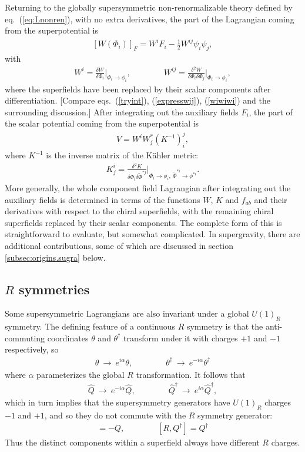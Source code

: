 \documentclass[11pt]{article}
\def\beq{\begin{eqnarray}}
\def\eeq{\end{eqnarray}}
\begin{document}
Returning to the globally supersymmetric non-renormalizable theory defined 
by eq.~(\ref{eq:Lnonren}), with no extra derivatives,
the part of the Lagrangian coming from the superpotential is
\beq
\left [ W(\Phi_i) \right ]_F = W^i F_i  - \frac{1}{2} W^{ij} \psi_i \psi_j ,
\eeq
with
\beq
W^i = \frac{\delta W}{\delta\Phi_i} 
\biggl |_{\Phi_i \rightarrow \phi_i},
\qquad\qquad
W^{ij} = \frac{\delta^{2} W}{\delta\Phi_i\delta \Phi_j}
\biggl |_{\Phi_i \rightarrow \phi_i}
,
\eeq
where the superfields have been replaced by their scalar components after 
differentiation.
[Compare eqs.~(\ref{tryint}), (\ref{expresswij}), (\ref{wiwiwi}) and the 
surrounding discussion.] After integrating out the auxiliary 
fields $F_i$, the part of the scalar potential coming from the 
superpotential is
\beq
V = W^i W_j^* (K^{-1})_i^j,
\eeq
where $K^{-1}$ is the inverse matrix of the K\"ahler metric:
\beq
K^i_j = \frac{\delta^2 K}{\delta \Phi_i \delta \tilde \Phi^{*j}} \biggl |_{\Phi_i 
\rightarrow \phi_i,\> \tilde \Phi^{*i}
\rightarrow \phi^{*i}}.
\eeq
More generally, the whole component field Lagrangian after integrating 
out the auxiliary fields is determined in 
terms of the functions $W$, $K$ and $f_{ab}$ and their derivatives with 
respect to the chiral superfields, with the remaining chiral superfields
replaced by their scalar components. 
The complete form of this is straightforward to evaluate, but somewhat 
complicated. In supergravity, there are additional contributions, some of 
which are discussed in section \ref{subsec:origins.sugra} below.

\subsection{$R$ symmetries\label{Rsymmetry}}
\setcounter{equation}{0}
\setcounter{footnote}{2}

Some supersymmetric Lagrangians are also invariant under a global 
$U(1)_R$ symmetry. The defining feature of a continuous $R$ symmetry is 
that the anti-commuting coordinates $\theta$ and $\theta^\dagger$ 
transform under it with charges $+1$ and $-1$ respectively, so
\beq
\theta \> \rightarrow \> e^{i \alpha} \theta,
\qquad\qquad
\theta^\dagger \> \rightarrow \> e^{-i \alpha} \theta^\dagger
\label{eq:Rtranstheta}
\eeq
where $\alpha$ parameterizes the global $R$ transformation. It follows that 
\beq
\hat Q \> \rightarrow \> e^{-i \alpha} \hat Q,
\qquad\qquad
\hat Q^\dagger \> \rightarrow \> e^{i \alpha} \hat Q^\dagger,
\eeq
which in turn implies that the supersymmetry generators have 
$U(1)_R$ charges $-1$ and $+1$, and so 
they do not commute
with the $R$ symmetry generator:
\beq
[R, Q] = -Q, \qquad\qquad
[R, Q^\dagger] = Q^\dagger
\eeq
Thus the distinct components within a superfield always have different $R$ charges.
\end{document}
